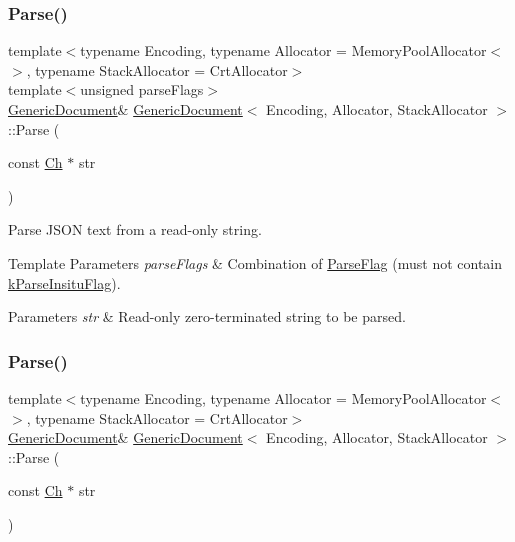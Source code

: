 \subsubsection{\texorpdfstring{Parse()}{Parse()}\hspace{0.1cm}{\footnotesize\ttfamily [2/3]}}
{\footnotesize\ttfamily template$<$typename Encoding, typename Allocator = Memory\+Pool\+Allocator$<$$>$, typename Stack\+Allocator = Crt\+Allocator$>$ \\
template$<$unsigned parse\+Flags$>$ \\
\hyperlink{class_generic_document}{Generic\+Document}\& \hyperlink{class_generic_document}{Generic\+Document}$<$ Encoding, Allocator, Stack\+Allocator $>$\+::Parse (\begin{DoxyParamCaption}\item[{const \hyperlink{class_generic_value_ade0e0ce64ccd5d852da57a35e720bafb}{Ch} $\ast$}]{str }\end{DoxyParamCaption})\hspace{0.3cm}{\ttfamily [inline]}}



Parse J\+S\+ON text from a read-\/only string. 


\begin{DoxyTemplParams}{Template Parameters}
{\em parse\+Flags} & Combination of \hyperlink{reader_8h_ab7be7dabe6ffcba60fad441505583450}{Parse\+Flag} (must not contain \hyperlink{reader_8h_ab7be7dabe6ffcba60fad441505583450a13188bd483b4df0b6582bebe2aeb5b01}{k\+Parse\+Insitu\+Flag}). \\
\hline
\end{DoxyTemplParams}

\begin{DoxyParams}{Parameters}
{\em str} & Read-\/only zero-\/terminated string to be parsed. \\
\hline
\end{DoxyParams}
\mbox{\label{class_generic_document_a49ae6de6fd0bc820d9864a106c10b4da}} 
\subsubsection{\texorpdfstring{Parse()}{Parse()}\hspace{0.1cm}{\footnotesize\ttfamily [3/3]}}
{\footnotesize\ttfamily template$<$typename Encoding, typename Allocator = Memory\+Pool\+Allocator$<$$>$, typename Stack\+Allocator = Crt\+Allocator$>$ \\
\hyperlink{class_generic_document}{Generic\+Document}\& \hyperlink{class_generic_document}{Generic\+Document}$<$ Encoding, Allocator, Stack\+Allocator $>$\+::Parse (\begin{DoxyParamCaption}\item[{const \hyperlink{class_generic_value_ade0e0ce64ccd5d852da57a35e720bafb}{Ch} $\ast$}]{str }\end{DoxyParamCaption})\hspace{0.3cm}{\ttfamily [inline]}}



